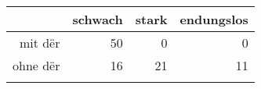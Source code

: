 \begin{tabular}{rrrr}
  \lsptoprule
 & schwach & stark & endungslos \\ 
  \midrule
mit dër & 50 & 0 & 0 \\ 
  ohne dër & 16 & 21 & 11 \\ 
   \lspbottomrule
\end{tabular}
